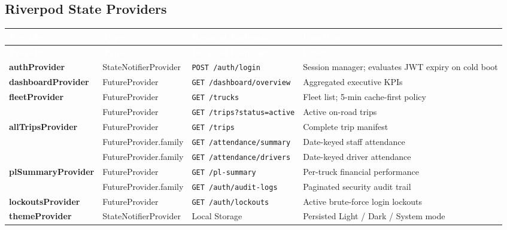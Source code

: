 \documentclass[11pt,a4paper]{article}
\newcommand{\theadstyle}[1]{\textcolor{white}{\bfseries #1}}
\begin{document}
\subsection{Riverpod State Providers}
\begin{longtable}{>{\ttfamily\bfseries\footnotesize\RaggedRight}p{3.1cm} >{\footnotesize}L{2.6cm} >{\footnotesize}L{3.1cm} >{\footnotesize}L{3.3cm}}
\theadstyle{Provider} & \theadstyle{Type} & \theadstyle{Backend Endpoint} & \theadstyle{Function} \\
\endfirsthead
{}
\theadstyle{Provider} & \theadstyle{Type} & \theadstyle{Backend Endpoint} & \theadstyle{Function} \\
\endhead
authProvider & StateNotifierProvider & \texttt{POST /auth/login} & Session manager; evaluates JWT expiry on cold boot \\
dashboardProvider & FutureProvider & \texttt{GET /dashboard/overview} & Aggregated executive KPIs \\
fleetProvider & FutureProvider & \texttt{GET /trucks} & Fleet list; 5-min cache-first policy \\
 & FutureProvider & \texttt{GET /trips?status=active} & Active on-road trips \\
allTripsProvider & FutureProvider & \texttt{GET /trips} & Complete trip manifest \\
 & FutureProvider.family & \texttt{GET /attendance/summary} & Date-keyed staff attendance \\
 & FutureProvider.family & \texttt{GET /attendance/drivers} & Date-keyed driver attendance \\
plSummaryProvider & FutureProvider & \texttt{GET /pl-summary} & Per-truck financial performance \\
 & FutureProvider.family & \texttt{GET /auth/audit-logs} & Paginated security audit trail \\
lockoutsProvider & FutureProvider & \texttt{GET /auth/lockouts} & Active brute-force login lockouts \\
themeProvider & StateNotifierProvider & Local Storage & Persisted Light / Dark / System mode \\
\end{longtable}
\end{document}

